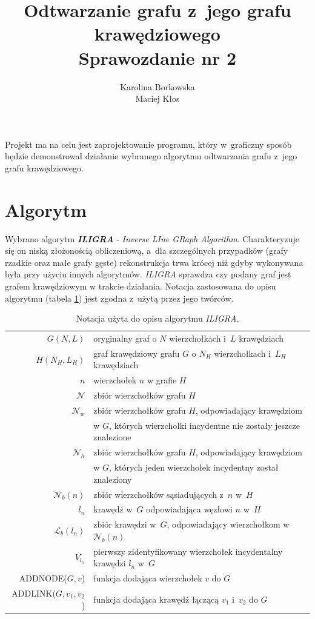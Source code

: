 \documentclass{article}
\date{}
\author{Karolina Borkowska \\ Maciej Kłos}
\title{Odtwarzanie grafu z~jego grafu krawędziowego\\
		{\large Sprawozdanie nr 2}}
\begin{document}
	\maketitle

Projekt ma na celu jest zaprojektowanie programu, który w~graficzny sposób będzie demonstrował
działanie wybranego algorytmu odtwarzania grafu z~jego grafu krawędziowego.

\section{Algorytm}

Wybrano algorytm \textbf{\textit{ILIGRA}}\cite{algo} - \textit{Inverse LIne GRaph Algorithm}. Charakteryzuje się on niską złożonością obliczeniową, a~dla szczególnych przypadków (grafy rzadkie oraz małe grafy gęste) rekonstrukcja trwa krócej niż gdyby wykonywana była przy użyciu innych algorytmów. \textit{ILIGRA} sprawdza czy podany graf jest grafem krawędziowym w trakcie działania. Notacja zastosowana do opisu algorytmu (tabela \ref{notacja}) jest zgodna z~użytą przez jego twórców. 

\begin{table}[H]
	\caption{Notacja użyta do opisu algorytmu \textit{ILIGRA}.}
	\label{notacja}

	
	\begin{tabular}{r l}
		\hline
		\hline
		$G(N,L)$&oryginalny graf o $N$ wierzchołkach i~$L$ krawędziach\\
		$H(N_H,L_H)$&graf krawędziowy grafu $G$ o $N_H$ wierzchołkach i~$L_H$ krawędziach\\
		$n$&wierzchołek $n$ w grafie $H$\\
		$\mathcal{N}$&zbiór wierzchołków grafu $H$\\
		$\mathcal{N}_w$&zbiór wierzchołków grafu $H$, odpowiadający krawędziom \\&w $G$, których wierzchołki incydentne nie zostały jeszcze znalezione\\
		$\mathcal{N}_h$&zbiór wierzchołków grafu $H$, odpowiadający krawędziom \\&w $G$, których jeden wierzchołek incydentny został znaleziony\\
		$\mathcal{N}_b(n)$&zbiór wierzchołków sąsiadujących z~$n$ w~$H$\\
		$l_n$&krawędź w~$G$ odpowiadająca węzłowi $n$ w~$H$\\
		$\mathcal{L}_b(l_n)$&zbiór krawędzi w~$G$, odpowiadający wierzchołkom w~$\mathcal{N}_b(n)$\\
		$V_{l_n}$&pierwszy zidentyfikowany wierzchołek incydentalny krawędzi $l_n$ w~$G$\\
		ADDNODE($G,v$)& funkcja dodająca wierzchołek $v$ do $G$\\
		ADDLINK($G,v_1,v_2$)&funkcja dodająca krawędź łączącą $v_1$ i~$v_2$ do $G$\\
 		\hline
	\end{tabular} 

\end{table}
\end{document}
